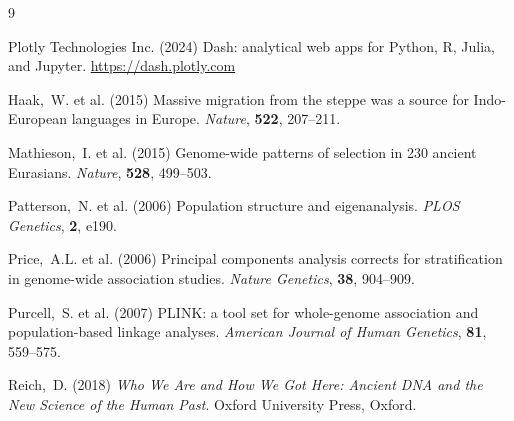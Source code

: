\documentclass[unnumsec,webpdf,contemporary,large]{oup-authoring-template}
\begin{document}
\begin{thebibliography}{9}

Plotly Technologies Inc. (2024)
\newblock Dash: analytical web apps for Python, R, Julia, and Jupyter.
\newblock \url{https://dash.plotly.com}

Haak,~W. et al. (2015)
\newblock Massive migration from the steppe was a source for Indo-European
  languages in Europe.
\newblock \textit{Nature}, \textbf{522}, 207--211.

Mathieson,~I. et al. (2015)
\newblock Genome-wide patterns of selection in 230 ancient Eurasians.
\newblock \textit{Nature}, \textbf{528}, 499--503.

Patterson,~N. et al. (2006)
\newblock Population structure and eigenanalysis.
\newblock \textit{PLOS Genetics}, \textbf{2}, e190.

Price,~A.L. et al. (2006)
\newblock Principal components analysis corrects for stratification in
  genome-wide association studies.
\newblock \textit{Nature Genetics}, \textbf{38}, 904--909.

Purcell,~S. et al. (2007)
\newblock PLINK: a tool set for whole-genome association and population-based
  linkage analyses.
\newblock \textit{American Journal of Human Genetics}, \textbf{81}, 559--575.

Reich,~D. (2018)
\newblock \textit{Who We Are and How We Got Here: Ancient DNA and the New
  Science of the Human Past}.
\newblock Oxford University Press, Oxford.

\end{thebibliography}
\end{document}
